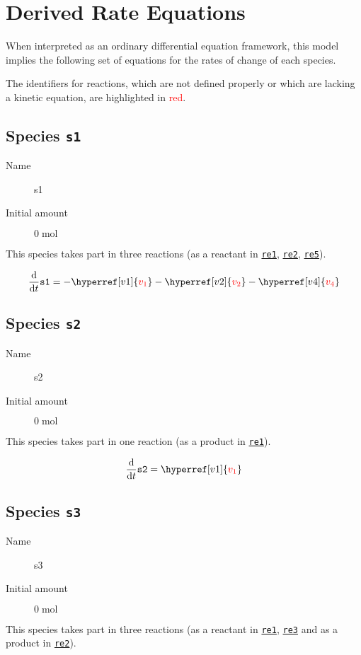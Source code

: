 \documentclass[11pt,twoside,a4paper]{scrartcl}
\begin{document}
\section{Derived Rate Equations}
\label{sec:DerivedRateEquations}
When interpreted as an ordinary differential equation framework, this model implies the following set of equations for the rates of change of each species. 

The identifiers for reactions, which are not defined properly or which are lacking a kinetic equation, are highlighted in \textcolor{red}{red}. 

\subsection{Species \texttt{s1}}
\begin{description}
\item[Name] s1
\item[Initial amount] $0\;\mathrm{mol}$
\end{description}
This species takes part in three reactions (as a reactant in  \hyperref[v1]{\texttt{re1}}, \hyperref[v2]{\texttt{re2}}, \hyperref[v4]{\texttt{re5}}).

\begin{dmath}
\frac{\mathrm d}{\mathrm dt} \mathtt{s1} = -\hyperref[v1]{\textcolor{red}{v_{1}}}-\hyperref[v2]{\textcolor{red}{v_{2}}}-\hyperref[v4]{\textcolor{red}{v_{4}}}
\end{dmath}

\subsection{Species \texttt{s2}}
\begin{description}
\item[Name] s2
\item[Initial amount] $0\;\mathrm{mol}$
\end{description}
This species takes part in one reaction (as a product in  \hyperref[v1]{\texttt{re1}}).

\begin{dmath}
\frac{\mathrm d}{\mathrm dt} \mathtt{s2} = \hyperref[v1]{\textcolor{red}{v_{1}}}
\end{dmath}

\subsection{Species \texttt{s3}}
\begin{description}
\item[Name] s3
\item[Initial amount] $0\;\mathrm{mol}$
\end{description}
This species takes part in three reactions (as a reactant in  \hyperref[v1]{\texttt{re1}}, \hyperref[v3]{\texttt{re3}} and as a product in  \hyperref[v2]{\texttt{re2}}).
\end{document}
